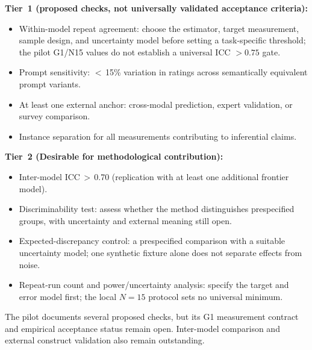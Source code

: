 \documentclass[11pt,a4paper]{article}
\begin{document}
\textbf{Tier~1 (proposed checks, not universally validated acceptance criteria):}
\begin{itemize}[nosep]
  \item Within-model repeat agreement: choose the estimator, target measurement, sample design, and uncertainty model before setting a task-specific threshold; the pilot G1/N15 values do not establish a universal ICC $>0.75$ gate.
  \item Prompt sensitivity: $<$\,15\% variation in ratings across semantically equivalent prompt variants.
  \item At least one external anchor: cross-modal prediction, expert validation, or survey comparison.
  \item Instance separation for all measurements contributing to inferential claims.
\end{itemize}

\textbf{Tier~2 (Desirable for methodological contribution):}
\begin{itemize}[nosep]
  \item Inter-model ICC\,$>$\,0.70 (replication with at least one additional frontier model).
  \item Discriminability test: assess whether the method distinguishes prespecified groups, with uncertainty and external meaning still open.
  \item Expected-discrepancy control: a prespecified comparison with a suitable uncertainty model; one synthetic fixture alone does not separate effects from noise.
  \item Repeat-run count and power/uncertainty analysis: specify the target and error model first; the local $N=15$ protocol sets no universal minimum.
\end{itemize}

The pilot documents several proposed checks, but its G1 measurement contract and empirical acceptance status remain open. Inter-model comparison and external construct validation also remain outstanding.
\end{document}
